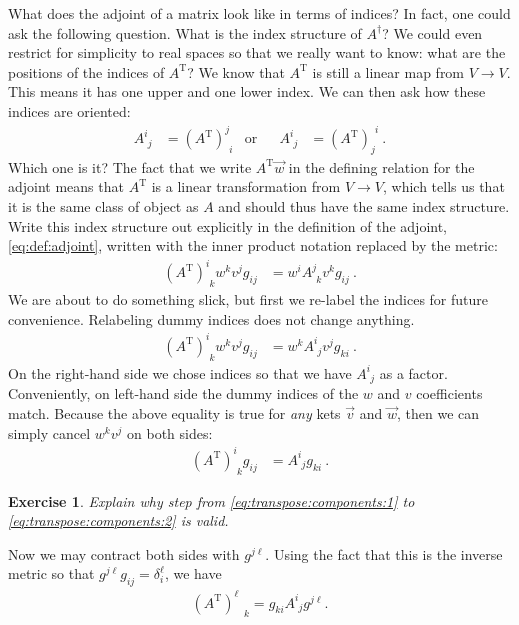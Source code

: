 \documentclass[
  11pt,
	colorful,
	raggedright,
]{tufte-style-thesis-flip}
\newtheorem{exercise}{Exercise}[section]
\newcommand{\aij}[2]{^{#1}_{\phantom{#1}#2}}
\begin{document}
What does the adjoint of a matrix look like in terms of indices? In fact, one could ask the following question. What is the index structure of $A^\dag$? We could even restrict for simplicity to real spaces so that we really want to know: what are the positions of the indices of $A^\text{T}$? We know that $A^\text{T}$ is still a linear map from $V\to V$. This means it has one upper and one lower index. We can then ask how these indices are oriented: 
\begin{align}
  A\aij{i}{j} &= \left(A^\text{T}\right)\aij{j}{i}
  &
  \text{or}
  &
  &
  A\aij{i}{j} &= \left(A^\text{T}\right)_j^{\phantom{j}i} \ .
\end{align}
Which one is it? The fact that we write $A^\text{T}\vec{w}$ in the defining relation for the adjoint means that $A^\text{T}$ is a linear transformation from $V\to V$, which tells us that it is the same class of object as $A$ and should thus have the same index structure. Write this index structure out explicitly in the definition of the adjoint, \eqref{eq:def:adjoint}, written with the inner product notation replaced by the metric:
\begin{align}
  \left(A^\text{T}\right)\aij{i}{k}w^k v^j g_{ij}
  &= 
  w^i A\aij{j}{k}v^k g_{ij} \ .
\end{align}
We are about to do something slick, but first we re-label the indices for future convenience. Relabeling dummy indices does not change anything.
\begin{align}
  \left(A^\text{T}\right)\aij{i}{k}w^k v^j g_{ij}
  &= 
  w^k A\aij{i}{j}v^j g_{ki} \ .
  \label{eq:transpose:components:1}
\end{align}
On the right-hand side we chose indices so that we have $A\aij{i}{j}$ as a factor. Conveniently, on left-hand side the dummy indices of the $w$ and $v$ coefficients match. Because the above equality is true for \emph{any} kets $\vec{v}$ and $\vec{w}$, then we can simply cancel $w^kv^j$ on both sides:
\begin{align}
  \left(A^\text{T}\right)\aij{i}{k} g_{ij}
  &= 
  A\aij{i}{j} g_{ki} \ .
  \label{eq:transpose:components:2}
\end{align}
\begin{exercise}
Explain why step from \eqref{eq:transpose:components:1} to \eqref{eq:transpose:components:2} is valid.
\end{exercise}
  Now we may contract both sides with $g^{j\ell}$. Using the fact that this is the inverse metric so that $g^{j\ell}g_{ij} = \delta^\ell_i$, we have
\begin{align}
  \left(A^\text{T}\right)\aij{\ell}{k}
  = 
  g_{ki}
  A\aij{i}{j} 
  g^{j\ell}
. 
\end{align}
\end{document}
